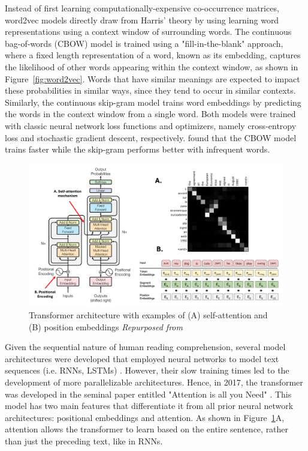Instead of first learning computationally-expensive co-occurrence matrices, word2vec models directly draw from Harris' theory by using learning word representations using a context window of surrounding words. The continuous bag-of-words (CBOW) model is trained using a "fill-in-the-blank" approach, where a fixed length representation of a word, known as its embedding, captures the likelihood of other words appearing within the context window, as shown in Figure~\ref{fig:word2vec}. Words that have similar meanings are expected to impact these probabilities in similar ways, since they tend to occur in similar contexts. Similarly, the continuous skip-gram model trains word embeddings by predicting the words in the context window from a single word. Both models were trained with classic neural network loss functions and optimizers, namely cross-entropy loss and stochastic gradient descent, respectively. \citet{mikolov2013efficient} found that the CBOW model trains faster while the skip-gram performs better with infrequent words. 

\begin{figure}[htbp]
	\centering
	\includegraphics[width=1\linewidth] {figures/transformer_arch.png}
	\caption{Transformer architecture with examples of (A) self-attention and (B) position embeddings \emph{Repurposed from  \cite{NIPS2017_3f5ee243, bahdanauNeuralMachineTranslation2015, devlin-etal-2019-bert}}} \label{fig:transformer}
\end{figure}

Given the sequential nature of human reading comprehension, several model architectures were developed that employed neural networks to model text sequences (i.e. RNNs, LSTMs) \citep{jozefowicz2016exploring}. However, their slow training times led to the development of more parallelizable architectures. Hence, in 2017, the transformer was developed in the seminal paper entitled "Attention is all you Need" \citep{NIPS2017_3f5ee243}. This model has two main features that differentiate it from all prior neural network architectures: positional embeddings and attention. As shown in Figure~\ref{fig:transformer}A, attention allows the transformer to learn based on the entire sentence, rather than just the preceding text, like in RNNs. 

